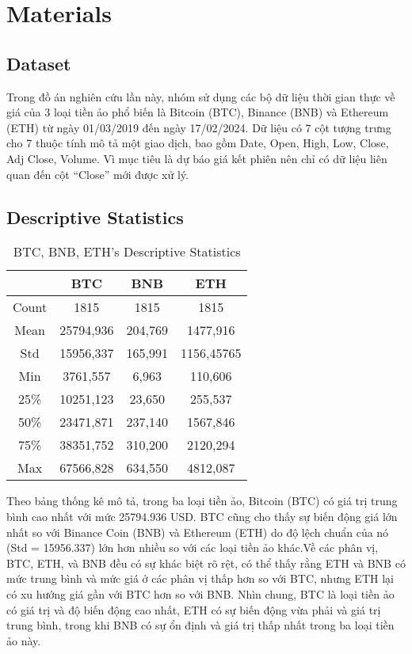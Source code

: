 \section{Materials}
\subsection{Dataset}

Trong đồ án nghiên cứu lần này, nhóm sử dụng các bộ dữ liệu thời gian thực về giá của 3 loại tiền ảo phổ biến là Bitcoin (BTC), Binance (BNB) và Ethereum (ETH) từ ngày 01/03/2019 đến ngày 17/02/2024. Dữ liệu có 7 cột tượng trưng cho 7 thuộc tính mô tả một giao dịch, bao gồm Date, Open, High, Low, Close, Adj Close, Volume. Vì mục tiêu là dự báo giá kết phiên nên chỉ có dữ liệu liên quan đến cột “Close” mới được xử lý.

\subsection{Descriptive Statistics}
\begin{table}[H]
  \centering
  \caption{BTC, BNB, ETH’s Descriptive Statistics}
\begin{tabular}{|c|c|c|c|}
    \hline
     & BTC & BNB & ETH \\ \hline
     Count & 1815 & 1815 & 1815 \\ \hline
     Mean & 25794,936 & 204,769 & 1477,916\\ \hline
     Std & 15956,337 & 165,991 & 1156,45765\\ \hline
     Min & 3761,557 & 6,963 & 110,606\\ \hline
     25\% & 10251,123 & 23,650 & 255,537\\ \hline
     50\% & 23471,871 & 237,140 & 1567,846\\ \hline
     75\% & 38351,752 & 310,200 & 2120,294\\ \hline
     Max & 67566,828 & 634,550 & 4812,087\\ \hline
\end{tabular}
\end{table}

Theo bảng thống kê mô tả, trong ba loại tiền ảo, Bitcoin (BTC) có giá trị trung bình cao nhất với mức 25794.936 USD. BTC cũng cho thấy sự biến động giá lớn nhất so với Binance Coin (BNB) và Ethereum (ETH) do độ lệch chuẩn của nó (Std = 15956.337) lớn hơn nhiều so với các loại tiền ảo khác.Về các phân vị, BTC, ETH, và BNB đều có sự khác biệt rõ rệt, có thể thấy rằng ETH và BNB có mức trung bình và mức giá ở các phân vị thấp hơn so với BTC, nhưng ETH lại có xu hướng giá gần với BTC hơn so với BNB. Nhìn chung, BTC là loại tiền ảo có giá trị và độ biến động cao nhất, ETH có sự biến động vừa phải và giá trị trung bình, trong khi BNB có sự ổn định và giá trị thấp nhất trong ba loại tiền ảo này.

